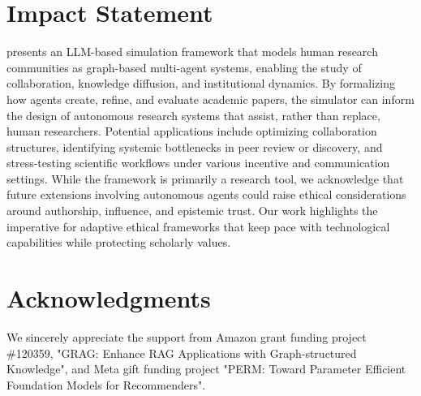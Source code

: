 \section*{Impact Statement}
\envname presents an LLM-based simulation framework that models human research communities as graph-based multi-agent systems, enabling the study of collaboration, knowledge diffusion, and institutional dynamics. By formalizing how agents create, refine, and evaluate academic papers, the simulator can inform the design of autonomous research systems that assist, rather than replace, human researchers. Potential applications include optimizing collaboration structures, identifying systemic bottlenecks in peer review or discovery, and stress-testing scientific workflows under various incentive and communication settings. While the framework is primarily a research tool, we acknowledge that future extensions involving autonomous agents could raise ethical considerations around authorship, influence, and epistemic trust. Our work highlights the imperative for adaptive ethical frameworks that keep pace with technological capabilities while protecting scholarly values.

\section*{Acknowledgments}
We sincerely appreciate the support from Amazon grant funding project \#120359, "GRAG: Enhance RAG Applications with Graph-structured Knowledge", and Meta gift funding project "PERM: Toward Parameter Efficient Foundation Models for Recommenders".